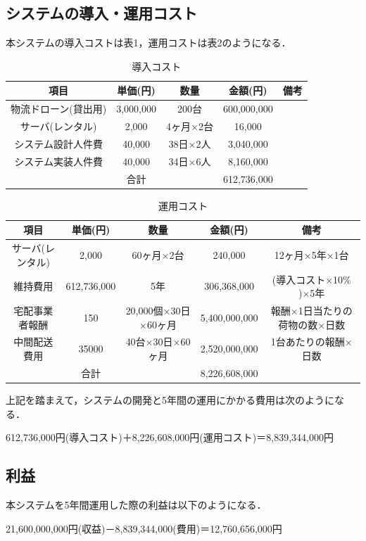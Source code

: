 \documentclass[a4paper, titlepage]{jsarticle}
\begin{document}
\subsection{システムの導入・運用コスト}
本システムの導入コストは表1，運用コストは表2のようになる．
\begin{table}[htbp]
    \centering
    \begin{tabular}{c c c c c}
    \hline
    項目 & 単価(円) & 数量 & 金額(円) & 備考 \\
    \hline \hline
    物流ドローン(貸出用) & 3,000,000 & 200台 & 600,000,000 &  \\
    サーバ(レンタル) & 2,000 & 4ヶ月×2台 & 16,000 & \\
    システム設計人件費 & 40,000 & 38日×2人 & 3,040,000 & \\
    システム実装人件費 & 40,000 & 34日×6人 & 8,160,000 & \\
    \hline \hline
     & 合計 &  & 612,736,000 &  \\
    \hline
    \end{tabular}
    \caption{導入コスト}
    \label{tab:label1}
\end{table}

\begin{table}[htbp]
    \centering
    \begin{tabular}{c c c c c}
    \hline
    項目 & 単価(円) & 数量 & 金額(円) & 備考 \\
    \hline \hline
    サーバ(レンタル) & 2,000 & 60ヶ月×2台 & 240,000 & 12ヶ月×5年×1台 \\
    維持費用 & 612,736,000 & 5年 & 306,368,000 & (導入コスト×10\% )×5年 \\
    宅配事業者報酬 & 150 & 20,000個×30日×60ヶ月 & 5,400,000,000 & 報酬×1日当たりの荷物の数×日数 \\
    中間配送費用 & 35000 & 40台×30日×60ヶ月 & 2,520,000,000 & 1台あたりの報酬×日数 \\
    \hline \hline
     & 合計 &  & 8,226,608,000 &  \\
    \hline
    \end{tabular}
    \caption{運用コスト}
    \label{tab:label2}
\end{table}

上記を踏まえて，システムの開発と5年間の運用にかかる費用は次のようになる．
\begin{center}
    612,736,000円(導入コスト)＋8,226,608,000円(運用コスト)＝8,839,344,000円
\end{center}

\subsection{利益}
本システムを5年間運用した際の利益は以下のようになる．
\begin{center}
    21,600,000,000円(収益)－8,839,344,000(費用)＝12,760,656,000円
\end{center}
\end{document}
